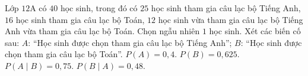 \begin{ex}
Lớp $12$A có $40$ học sinh, trong đó có $25$ học sinh tham gia câu lạc bộ Tiếng Anh, $16$ học sinh tham gia câu lạc bộ Toán, $12$ học sinh vừa tham gia câu lạc bộ Tiếng Anh vừa tham gia câu lạc bộ Toán. Chọn ngẫu nhiên $1$ học sinh. Xét các biến cố sau: $A$: ``Học sinh được chọn tham gia câu lạc bộ Tiếng Anh''; $B$: ``Học sinh được chọn tham gia câu lạc bộ Toán''.
\choiceTF
{$P(A)=0{,}4$.}
{$P(B)=0{,}625$.}
{\True $P(A\mid B)=0{,}75$.}
{\True $P(B\mid A)=0{,}48$.}
\end{ex}
